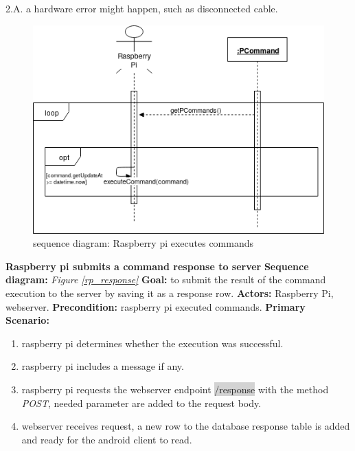 \documentclass[12pt, oneside, a4paper]{book}
\newcommand{\code}[1]{{\color{red}\colorbox{lightgray}{#1}}}
\newcommand\boldcolor[1]{\textcolor{bold}{\textbf{#1}}}
\begin{document}
				\hspace*{5mm}2.A. a hardware error might happen, such as disconnected cable. \\
				\begin{figure}[H]
					\includegraphics[width=\linewidth]{img/sequence_execute.png}
					\caption{sequence diagram: Raspberry pi executes commands}					
					\label{rp_execute}
				\end{figure}
				\newpage\hspace*{-6mm}\boldcolor{Raspberry pi submits a command response to server}
				\newline\textbf{Sequence diagram:} \textit{Figure \ref{rp_response}}
				\newline\textbf{Goal:} to submit the result of the command execution to the server by saving it as a response row.
				\newline\textbf{Actors:} Raspberry Pi, webserver.
				\newline\textbf{Precondition:} raspberry pi executed commands.
				\newline\textbf{Primary Scenario:}	
				\begin{enumerate}[label*=\arabic*.]
					\item raspberry pi determines whether the execution was successful. 
					\item raspberry pi includes a message if any.
					\item  raspberry pi requests the webserver endpoint \code{/response} with the method \textit{POST}, needed parameter are added to the request body.
					\item webserver receives request, a new row to the database response table is added and ready for the android client to read. 
				\end{enumerate}
\end{document}
